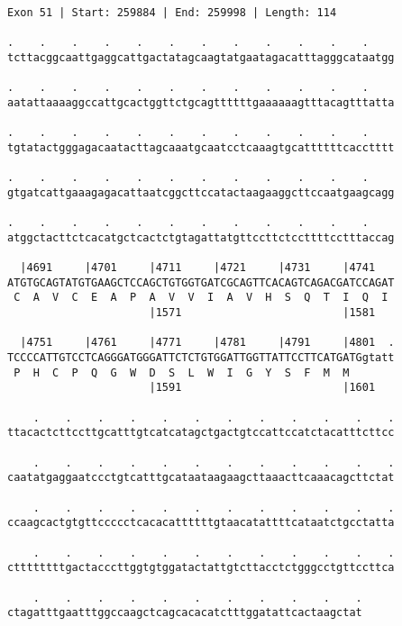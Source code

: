 \documentclass{article}
\begin{document}
\newpage
\begin{Verbatim}[fontfamily=courier]
Exon 51 | Start: 259884 | End: 259998 | Length: 114

.    .    .    .    .    .    .    .    .    .    .    .    
tcttacggcaattgaggcattgactatagcaagtatgaatagacatttagggcataatgg

.    .    .    .    .    .    .    .    .    .    .    .    
aatattaaaaggccattgcactggttctgcagttttttgaaaaaagtttacagtttatta

.    .    .    .    .    .    .    .    .    .    .    .    
tgtatactgggagacaatacttagcaaatgcaatcctcaaagtgcattttttcacctttt

.    .    .    .    .    .    .    .    .    .    .    .    
gtgatcattgaaagagacattaatcggcttccatactaagaaggcttccaatgaagcagg

.    .    .    .    .    .    .    .    .    .    .    .    
atggctacttctcacatgctcactctgtagattatgttccttctccttttcctttaccag

  |4691     |4701     |4711     |4721     |4731     |4741   
ATGTGCAGTATGTGAAGCTCCAGCTGTGGTGATCGCAGTTCACAGTCAGACGATCCAGAT
 C  A  V  C  E  A  P  A  V  V  I  A  V  H  S  Q  T  I  Q  I 
                      |1571                         |1581   

  |4751     |4761     |4771     |4781     |4791     |4801  .
TCCCCATTGTCCTCAGGGATGGGATTCTCTGTGGATTGGTTATTCCTTCATGATGgtatt
 P  H  C  P  Q  G  W  D  S  L  W  I  G  Y  S  F  M  M       
                      |1591                         |1601   

    .    .    .    .    .    .    .    .    .    .    .    .
ttacactcttccttgcatttgtcatcatagctgactgtccattccatctacatttcttcc

    .    .    .    .    .    .    .    .    .    .    .    .
caatatgaggaatccctgtcatttgcataataagaagcttaaacttcaaacagcttctat

    .    .    .    .    .    .    .    .    .    .    .    .
ccaagcactgtgttccccctcacacattttttgtaacatattttcataatctgcctatta

    .    .    .    .    .    .    .    .    .    .    .    .
cttttttttgactacccttggtgtggatactattgtcttacctctgggcctgttccttca

    .    .    .    .    .    .    .    .    .    .    .
ctagatttgaatttggccaagctcagcacacatctttggatattcactaagctat
\end{Verbatim}
\newpage
\end{document}
